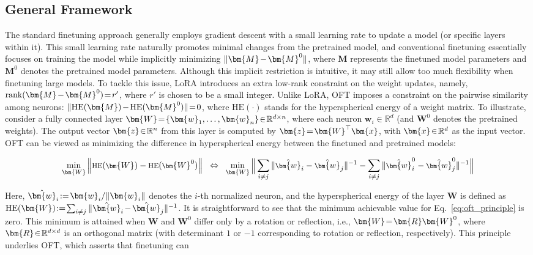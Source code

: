 \subsection{General Framework}

The standard finetuning approach generally employs gradient descent with a small learning rate to update a model (or specific layers within it). This small learning rate naturally promotes minimal changes from the pretrained model, and conventional finetuning essentially focuses on training the model while implicitly minimizing $\thickmuskip=2mu \medmuskip=2mu \| \bm{M} - \bm{M}^0\|$, where $\bm{M}$ represents the finetuned model parameters and $\bm{M}^0$ denotes the pretrained model parameters. Although this implicit restriction is intuitive, it may still allow too much flexibility when finetuning large models. To tackle this issue, LoRA introduces an extra low-rank constraint on the weight updates, namely, $\thickmuskip=2mu \medmuskip=2mu \text{rank}(\bm{M} - \bm{M}^0) = r'$, where $r'$ is chosen to be a small integer. Unlike LoRA, OFT imposes a constraint on the pairwise similarity among neurons: $\thickmuskip=2mu \medmuskip=2mu \| \text{HE}(\bm{M}) - \text{HE}(\bm{M}^0) \| = 0$, where $\text{HE}(\cdot)$ stands for the hyperspherical energy of a weight matrix. To illustrate, consider a fully connected layer $\thickmuskip=2mu \medmuskip=2mu \bm{W} = \{\bm{w}_1, \ldots, \bm{w}_n\} \in \mathbb{R}^{d \times n}$, where each neuron $\bm{w}_i \in \mathbb{R}^d$ (and $\bm{W}^0$ denotes the pretrained weights). The output vector $\thickmuskip=2mu \medmuskip=2mu \bm{z} \in \mathbb{R}^n$ from this layer is computed by $\thickmuskip=2mu \medmuskip=2mu \bm{z} = \bm{W}^\top \bm{x}$, with $\thickmuskip=2mu \medmuskip=2mu \bm{x} \in \mathbb{R}^d$ as the input vector. OFT can be viewed as minimizing the difference in hyperspherical energy between the finetuned and pretrained models:

\begin{equation}\label{eq:oft_principle}
\footnotesize
\min_{\bm{W}} \left\| \text{HE}(\bm{W}) - \text{HE}(\bm{W}^0) \right\|~~\Leftrightarrow~~ \min_{\bm{W}} \bigg{\|} \sum_{i \neq j} \| \hat{\bm{w}}_i - \hat{\bm{w}}_j \|^{-1} - \sum_{i \neq j} \| \hat{\bm{w}}_i^0 - \hat{\bm{w}}_j^0 \|^{-1} \bigg{\|}
\end{equation}

Here, $\thickmuskip=2mu \medmuskip=2mu \hat{\bm{w}}_i := \bm{w}_i / \|\bm{w}_i\|$ denotes the $i$-th normalized neuron, and the hyperspherical energy of the layer $\bm{W}$ is defined as $\thickmuskip=2mu \medmuskip=2mu \text{HE}(\bm{W}) := \sum_{i \neq j} \|\hat{\bm{w}}_i - \hat{\bm{w}}_j\|^{-1}$. It is straightforward to see that the minimum achievable value for Eq.~\eqref{eq:oft_principle} is zero. This minimum is attained when $\bm{W}$ and $\bm{W}^0$ differ only by a rotation or reflection, i.e., $\thickmuskip=2mu \medmuskip=2mu \bm{W} = \bm{R} \bm{W}^0$, where $\thickmuskip=2mu \medmuskip=2mu \bm{R} \in \mathbb{R}^{d \times d}$ is an orthogonal matrix (with determinant $1$ or $-1$ corresponding to rotation or reflection, respectively). This principle underlies OFT, which asserts that finetuning can

